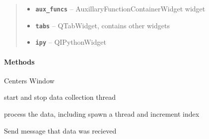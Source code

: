 \documentclass[letterpaper,10pt,english]{sphinxmanual}
\begin{document}
\begin{fulllineitems}
\begin{quote}
\begin{description}
\begin{itemize}
\item {} 
\textbf{\texttt{aux\_funcs}} -- AuxillaryFunctionContainerWidget widget

\item {} 
\textbf{\texttt{tabs}} -- QTabWidget, contains other widgets

\item {} 
\textbf{\texttt{ipy}} -- QIPythonWidget

\end{itemize}

\end{description}\end{quote}
\paragraph{Methods}

\begin{fulllineitems}
\label{MainWindow:SpinorMonitor.MainWindow.center}
Centers Window

\end{fulllineitems}


\begin{fulllineitems}
\label{MainWindow:SpinorMonitor.MainWindow.change_state}
start and stop data collection thread

\end{fulllineitems}


\begin{fulllineitems}
\label{MainWindow:SpinorMonitor.MainWindow.data_process}
process the data, including spawn a thread and increment index

\end{fulllineitems}


\begin{fulllineitems}
\label{MainWindow:SpinorMonitor.MainWindow.data_recieved}
Send message that data was recieved

\end{fulllineitems}


\end{fulllineitems}
\end{document}
